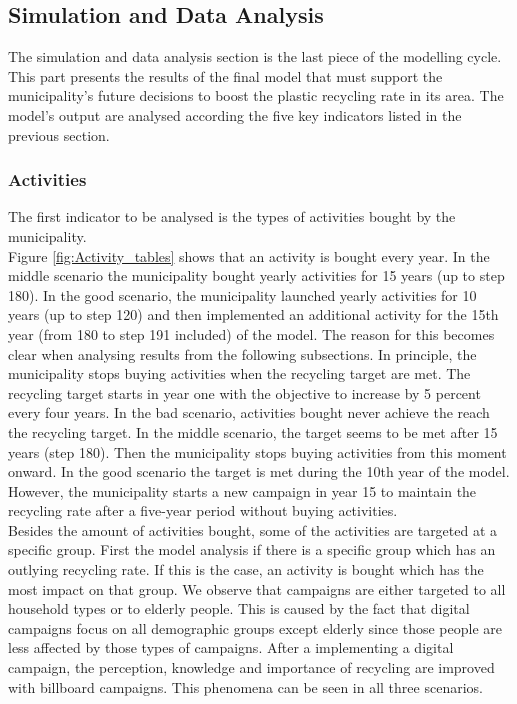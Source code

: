 \newpage
\subsection{Simulation and Data Analysis}
The simulation and data analysis section is the last piece of the modelling cycle. This part presents the results of the final model that must support the municipality's future decisions to boost the plastic recycling rate in its area. The model's output are analysed according the five key indicators listed in the previous section. 

\subsubsection{Activities}
\noindent The first indicator to be analysed is the types of activities bought by the municipality. \\

\noindent Figure \ref{fig:Activity_tables} shows that an activity is bought every year. In the middle scenario the municipality bought yearly activities for 15 years (up to step 180). In the good scenario, the municipality launched yearly activities for 10 years (up to step 120) and then implemented an additional activity for the 15th year (from 180 to step 191 included) of the model. The reason for this becomes clear when analysing results from the following subsections. In principle, the municipality stops buying activities when the recycling target are met. The recycling target starts in year one with the objective to increase by 5 percent every four years. In the bad scenario, activities bought never achieve the reach the recycling target. In the middle scenario, the target seems to be met after 15 years (step 180). Then the municipality stops buying activities from this moment onward. In the good scenario the target is met during the 10th year of the model. However, the municipality starts a new campaign in year 15 to maintain the recycling rate after a five-year period without buying activities. \\

\noindent Besides the amount of activities bought, some of the activities are targeted at a specific group. First the model analysis if there is a specific group which has an outlying recycling rate. If this is the case, an activity is bought which has the most impact on that group. We observe that campaigns are either targeted to all household types or to elderly people. This is caused by the fact that digital campaigns focus on all demographic groups except elderly since those people are less affected by those types of campaigns. After a implementing a digital campaign, the perception, knowledge and importance of recycling are improved with billboard campaigns. This phenomena can be seen in all three scenarios.


